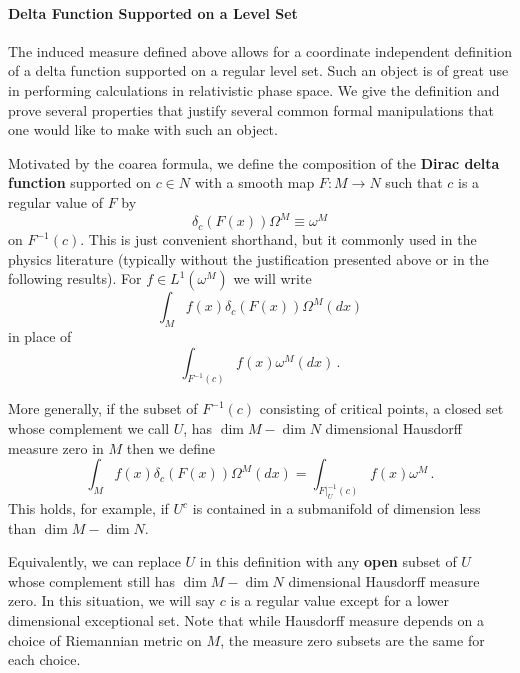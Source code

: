 \paragraph{Delta Function Supported on a Level Set}
 The induced measure defined above allows for a coordinate independent definition of a delta function supported on a regular level set.  Such an object is of great use in performing calculations in relativistic phase space.  We give the definition and prove several properties that justify several common formal manipulations that one would like to make with such an object.
\begin{definition}
Motivated by the coarea formula, we define the composition of the {\bf Dirac delta function} supported on $c\in N$ with a smooth map $F:M\rightarrow N$ such that $c$ is a regular value of $F$ by
\begin{equation}\label{delta_def}
 \delta_c(F(x))\Omega^M \equiv \omega^M
\end{equation}
on $F^{-1}(c)$.  This is just convenient shorthand, but it commonly used in the physics literature (typically without the justification presented above or in the following results).   For $f\in L^1(\omega^M)$ we will write 
\begin{equation}
\int_M f(x)\delta_c(F(x))\Omega^M(dx)
\end{equation} 
in place of 
\begin{equation}
\int_{F^{-1}(c)} f(x) \omega^M(dx)\,.
\end{equation}



More generally, if the subset of $F^{-1}(c)$ consisting of critical points, a closed set whose complement we call $U$, has $\dim M-\dim N$ dimensional Hausdorff measure zero in $M$ then we define
\begin{equation}
\int_M f(x)\delta_c(F(x))\Omega^M(dx)=\int_{F|_U^{-1}(c)} f(x)\omega^M\,.
\end{equation}
This holds, for example, if $U^c$ is contained in a submanifold of dimension less than  $\dim M-\dim N$.  

Equivalently, we can replace $U$ in this definition with any {\bf open} subset of $U$ whose complement still has $\dim M-\dim N$ dimensional Hausdorff measure zero. In this situation, we will say $c$ is a regular value except for a lower dimensional exceptional set.  Note that while Hausdorff measure depends on a choice of Riemannian metric on $M$, the measure zero subsets are the same for each choice.
\begin{comment}
Hausdorff measures commutes with restriction to subspaces (w/subspace metric)
Hausdorff measure on a submanifold induced by pullback metric tensor equals that induced by restriction of distance metric from ambient space.
Hausdorff measure of subsets of a manifold being zero is well defined (i.e. ind of choice of metric) so we can define k-dimensional measure zero for any k (integer or not). This follows since vol forms are abs cont wrt hausdorff measure of that dim
\end{comment}
\end{definition}

